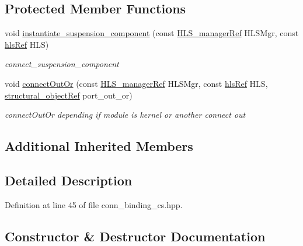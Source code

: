 \subsection*{Protected Member Functions}
\begin{DoxyCompactItemize}
\item 
void \hyperlink{classconn__binding__cs_a3738b716c0672637acb76998cfabbf71}{instantiate\+\_\+suspension\+\_\+component} (const \hyperlink{hls__manager_8hpp_acd3842b8589fe52c08fc0b2fcc813bfe}{H\+L\+S\+\_\+manager\+Ref} H\+L\+S\+Mgr, const \hyperlink{hls_8hpp_a75d0c73923d0ddfa28c4843a802c73a7}{hls\+Ref} H\+LS)
\begin{DoxyCompactList}\small\item\em connect\+\_\+suspension\+\_\+component \end{DoxyCompactList}\item 
void \hyperlink{classconn__binding__cs_aedc1d5c3adcfc3f539d6ca0352dd7547}{connect\+Out\+Or} (const \hyperlink{hls__manager_8hpp_acd3842b8589fe52c08fc0b2fcc813bfe}{H\+L\+S\+\_\+manager\+Ref} H\+L\+S\+Mgr, const \hyperlink{hls_8hpp_a75d0c73923d0ddfa28c4843a802c73a7}{hls\+Ref} H\+LS, \hyperlink{structural__objects_8hpp_a8ea5f8cc50ab8f4c31e2751074ff60b2}{structural\+\_\+object\+Ref} port\+\_\+out\+\_\+or)
\begin{DoxyCompactList}\small\item\em connect\+Out\+Or depending if module is kernel or another connect out \end{DoxyCompactList}\end{DoxyCompactItemize}
\subsection*{Additional Inherited Members}


\subsection{Detailed Description}


Definition at line 45 of file conn\+\_\+binding\+\_\+cs.\+hpp.



\subsection{Constructor \& Destructor Documentation}
\mbox{\label{classconn__binding__cs_a6771b62e0aee17c9241b2350635a017e}} 
